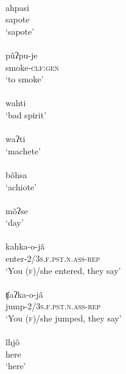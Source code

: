 \documentclass[output=paper]{langscibook}
\begin{document}
\begin{exe}
\ex\label{exe-gs-h-nogood}
\begin{xlist}
\ex
	\ea
	\glll [ah.pa.si]\\
	ahpasi\\
	sapote\\
	\trans `sapote'\\
	{\citep[102]{Bruil:2014}}
	\ex \glll [pũʔ.pu.je]\\
	pũʔpu-je\\
	smoke-\textsc{clf:gen}\\
	\trans `to smoke'\\
	{\citep[90]{Bruil:2014}}
	\z
\ex
	\ea
	\gll [wah.ti]\\
	wahti\\
	\trans `bad spirit'\\
	{\citep[84]{Bruil:2014}}
	\ex \gll [waʔ.ti]\\
	waʔti\\
	\trans `machete'\\
	{\citep[84]{Bruil:2014}}
	\z
\ex
	\ea
	\gll [p̰õh̃.sa]\\
	bõhsa\\
	\trans `achiote'\\
	{\citep[20120912elicr007]{Bruil:2012}}
	\ex
	\gll [mõʔ.se]\\
	mõʔse\\
	\trans `day'\\
	{\citep[20120919elicr005]{Bruil:2012}}
	\z
\ex
	\ea
	\\
	kahka-o-jã\\
	enter-\textsc{2/3s.f.pst.n.ass-rep}\\
	\trans `You (\textsc{f})/she entered, they say'\\
	{\citep[20120918elicr003]{Bruil:2012}}
	\ex {}\\
	ʧaʔka-o-jã\\
	jump-\textsc{2/3s.f.pst.n.ass-rep}\\
	\trans `You (\textsc{f})/she jumped, they say'\\
	{\citep[20120918elicr003]{Bruil:2012}}
	\z
\ex
	\ea
	\glll [ĩh̃.ɲõ]\\
	ĩhjõ\\
	here\\
	\trans `here'\\
	{\citep[20120912elicr007]{Bruil:2012}}


\end{xlist}
\end{exe}
\end{document}
